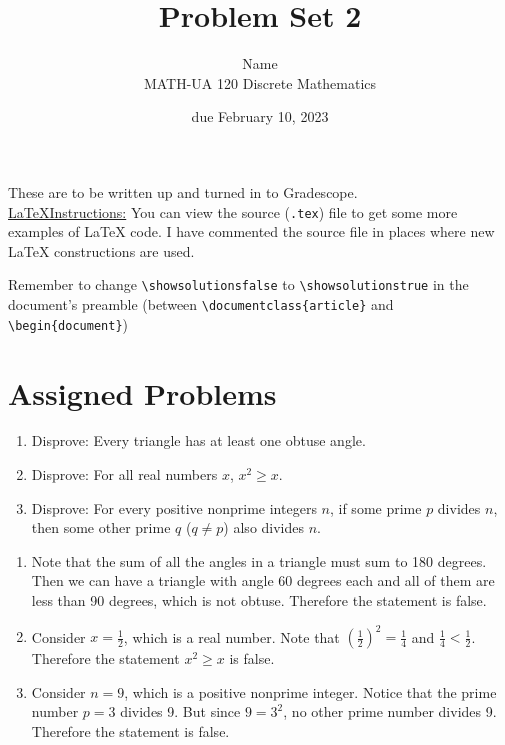 \documentclass{article}
\title{Problem Set 2}
\author{%
    Name
\\  MATH-UA 120 Discrete Mathematics
}
\date{due February 10, 2023}
\newif\ifshowsolutions
\newcommand{\danger}{\marginpar[\hfill\dbend]{\dbend\hfill}}
\theoremstyle{definition}
\begin{document}
\maketitle



These are to be written up and turned in to Gradescope.\\



\ifshowsolutions
    \SetupExSheets{solution/print=true}
\else
    \danger
 \underline{ \LaTeX  Instructions:}  You can view the source (\texttt{.tex}) file to get some more examples of \LaTeX{} code.  I have commented the source file in places where new \LaTeX{} constructions are used.
  
  Remember to change \verb|\showsolutionsfalse| to \verb|\showsolutionstrue|
    in the document's preamble 
    (between \verb|\documentclass{article}| and \verb|\begin{document}|)
\fi

\section*{Assigned Problems}


\begin{question}
    \begin{enumerate}
        \item Disprove: Every triangle has at least one obtuse angle.
        \item Disprove: For all real numbers $x$, $x^2\geq x$.
        \item Disprove: For every positive nonprime integers $n$, if some prime $p$ divides $n$, 
            then some other prime $q$ ($q\neq p$) also divides $n$.
    \end{enumerate}
\end{question}
\begin{solution}
\begin{enumerate}
\item Note that the sum of all the angles in a triangle must sum to 180 degrees. Then we can have a triangle with angle 60 degrees each and all of them are less than 90 degrees, which is not obtuse. Therefore the statement is false.

\item Consider $x=\frac{1}{2}$, which is a real number. Note that $\left(\frac{1}{2}\right)^2=\frac{1}{4}$ and $\frac{1}{4}< \frac{1}{2}$. Therefore the statement $x^2\geq x$ is false.

\item Consider $n=9$, which is a positive nonprime integer. Notice that the prime number $p=3$ divides 9. But since $9=3^2$, no other prime number divides 9. Therefore the statement is false.
\end{enumerate}
\end{solution}
\end{document}
